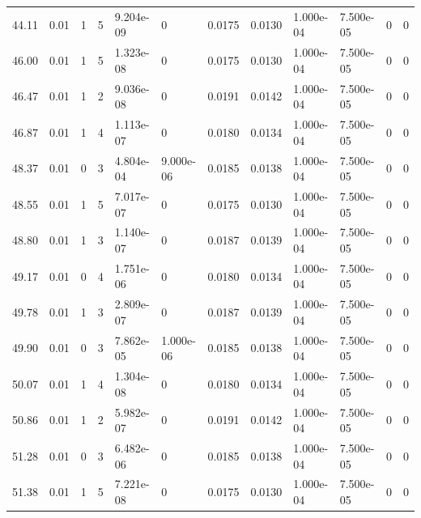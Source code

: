 \documentclass[preview]{standalone}
\begin{document}
{{{\begin{tabular}{L{1.2cm}C{1.2cm} C{0.3cm}C{0.5cm} C{1.4cm}C{1.4cm} C{1.4cm}C{1.4cm} C{1.6cm}C{1.6cm} C{1.6cm}C{1.6cm}}
  44.11  &  0.01  & 1     &  5 &  9.204e-09  & 0  &  0.0175&   0.0130& 1.000e-04 & 7.500e-05   &  0 & 0  \\ 
  46.00  &  0.01  & 1     &  5 &  1.323e-08  & 0  &  0.0175&   0.0130& 1.000e-04 & 7.500e-05   &  0 & 0  \\ 
  46.47  &  0.01  & 1     &  2 &  9.036e-08  & 0  &  0.0191&   0.0142& 1.000e-04 & 7.500e-05   &  0 & 0  \\ 
  46.87  &  0.01  & 1     &  4 &  1.113e-07  & 0  &  0.0180&   0.0134& 1.000e-04 & 7.500e-05   &  0 & 0  \\ 
  48.37  &  0.01  & 0     &  3 &  4.804e-04  & 9.000e-06  &  0.0185&   0.0138& 1.000e-04 & 7.500e-05   &  0 & 0  \\ 
  48.55  &  0.01  & 1     &  5 &  7.017e-07  & 0  &  0.0175&   0.0130& 1.000e-04 & 7.500e-05   &  0 & 0  \\ 
  48.80  &  0.01  & 1     &  3 &  1.140e-07  & 0  &  0.0187&   0.0139& 1.000e-04 & 7.500e-05   &  0 & 0  \\ 
  49.17  &  0.01  & 0     &  4 &  1.751e-06  & 0  &  0.0180&   0.0134& 1.000e-04 & 7.500e-05   &  0 & 0  \\ 
  49.78  &  0.01  & 1     &  3 &  2.809e-07  & 0  &  0.0187&   0.0139& 1.000e-04 & 7.500e-05   &  0 & 0  \\ 
  49.90  &  0.01  & 0     &  3 &  7.862e-05  & 1.000e-06  &  0.0185&   0.0138& 1.000e-04 & 7.500e-05   &  0 & 0  \\ 
  50.07  &  0.01  & 1     &  4 &  1.304e-08  & 0  &  0.0180&   0.0134& 1.000e-04 & 7.500e-05   &  0 & 0  \\ 
  50.86  &  0.01  & 1     &  2 &  5.982e-07  & 0  &  0.0191&   0.0142& 1.000e-04 & 7.500e-05   &  0 & 0  \\ 
  51.28  &  0.01  & 0     &  3 &  6.482e-06  & 0  &  0.0185&   0.0138& 1.000e-04 & 7.500e-05   &  0 & 0  \\ 
  51.38  &  0.01  & 1     &  5 &  7.221e-08  & 0  &  0.0175&   0.0130& 1.000e-04 & 7.500e-05   &  0 & 0  \\ 
\hline 
\end{tabular} 

}}}
\end{document}

